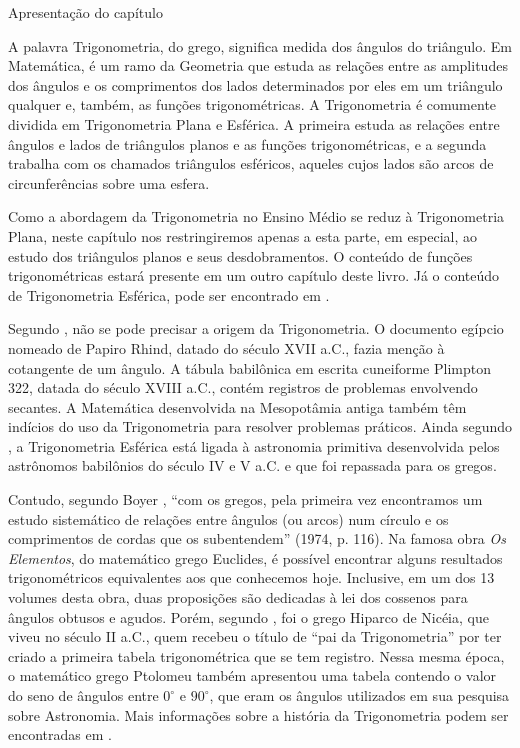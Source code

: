 \begin{apresentacao}{Apresentação do capítulo}

A palavra Trigonometria, do grego, significa medida dos ângulos do triângulo.
%
Em Matemática, é um ramo da Geometria que estuda as relações entre as amplitudes dos ângulos e os comprimentos dos lados determinados por eles em um triângulo qualquer e, também, as funções trigonométricas. 
%
A Trigonometria é comumente dividida em Trigonometria Plana e Esférica. 
%
A primeira estuda as relações entre ângulos e lados de triângulos planos e as funções trigonométricas, e a segunda trabalha com os chamados triângulos esféricos, aqueles cujos lados são arcos de circunferências sobre uma esfera. 

Como a abordagem da Trigonometria no Ensino Médio se reduz à Trigonometria Plana, neste capítulo nos restringiremos apenas a esta parte, em especial, ao estudo dos triângulos planos e seus desdobramentos. 
%
O conteúdo de funções trigonométricas estará presente em um outro capítulo deste livro. 
%
Já o conteúdo de Trigonometria Esférica, pode ser encontrado em \cite{coutinho2001}. 

Segundo \citet{eves1995}, não se pode precisar a origem da Trigonometria.
%
O documento egípcio nomeado de Papiro Rhind, datado do século XVII a.C., fazia menção à cotangente de um ângulo. 
%
A tábula babilônica em escrita cuneiforme Plimpton 322, datada do século XVIII a.C., contém registros de problemas envolvendo secantes. 
%
A Matemática desenvolvida na Mesopotâmia antiga também têm indícios do uso da Trigonometria para resolver problemas práticos.
%
Ainda segundo \citeauthor{eves1995}, a Trigonometria Esférica está ligada à astronomia primitiva desenvolvida pelos astrônomos babilônios do século IV e V a.C. e que foi repassada para os gregos.

Contudo, segundo Boyer \citeauthor{boyer1974}, ``com os gregos, pela primeira vez encontramos um estudo sistemático de relações entre ângulos (ou arcos) num círculo e os comprimentos de cordas que os subentendem'' \cite[p. 116]{boyer1974}(1974, p. 116).
%
Na famosa obra \textit{Os Elementos}, do matemático grego Euclides, é possível encontrar alguns resultados trigonométricos equivalentes aos que conhecemos hoje. 
%
Inclusive, em um dos 13 volumes desta obra, duas proposições são dedicadas à lei dos cossenos para ângulos obtusos e agudos. 
%
Porém, segundo \citeauthor{eves1995}, foi o grego Hiparco de Nicéia, que viveu no século II a.C., quem recebeu o título de ``pai da Trigonometria'' por ter criado a primeira tabela trigonométrica que se tem registro. 
%
Nessa mesma época, o matemático grego Ptolomeu também apresentou uma tabela contendo o valor do seno de ângulos entre $0^\circ$ e $90^\circ$, que eram os ângulos utilizados em sua pesquisa sobre Astronomia. 
%
Mais informações sobre a história da Trigonometria podem ser encontradas em \cite{eves1995,boyer1974,roque2012}. 


\end{apresentacao}
